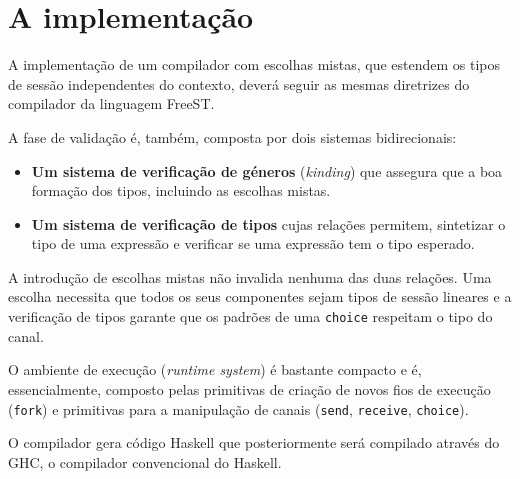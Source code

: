 \section{A implementação}

A implementação de um compilador com escolhas mistas, que estendem os tipos de sessão
independentes do contexto, deverá seguir as mesmas diretrizes do compilador da linguagem FreeST\cite{2019freest,2019freest-inforum}.

A fase de validação é, também, composta por dois sistemas bidirecionais:
\begin{itemize}
\item \textbf{Um sistema de verificação de géneros} (\textit{kinding}) que assegura que a boa formação dos tipos, incluindo as escolhas mistas.
\item \textbf{Um sistema de verificação de tipos} cujas relações permitem, sintetizar o tipo de uma expressão e verificar se uma expressão tem o tipo esperado. 
\end{itemize}
A introdução de escolhas mistas não invalida nenhuma das duas relações.
Uma escolha necessita que todos os seus componentes sejam tipos de sessão lineares e a verificação de tipos garante que os padrões de uma \lstinline|choice| respeitam o tipo do canal.

O ambiente de execução (\textit{runtime system}) é bastante compacto e é, essencialmente, composto pelas primitivas de criação de novos fios de execução (\lstinline|fork|) e primitivas para a manipulação de canais (\lstinline|send|, \lstinline|receive|, \lstinline|choice|).


O compilador gera código Haskell que posteriormente será compilado através do GHC, o compilador convencional do Haskell.

